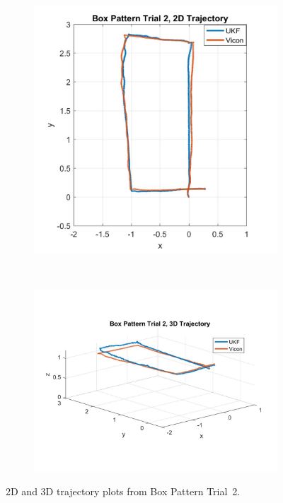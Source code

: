 \begin{figure}
    \centering
    \begin{subfigure}{0.4\textwidth}
        \includegraphics[width=\textwidth,left]{box2_2d}
    \end{subfigure}%
    ~ 
    \begin{subfigure}{0.6\textwidth}
        \centering
        \includegraphics[width=\textwidth,right]{box2_3d}
    \end{subfigure}
    \caption[Box Pattern Trial 2 Trajectory]{2D and 3D trajectory plots from Box Pattern Trial~2.}
    \label{fig:box2_traj}
\end{figure}

